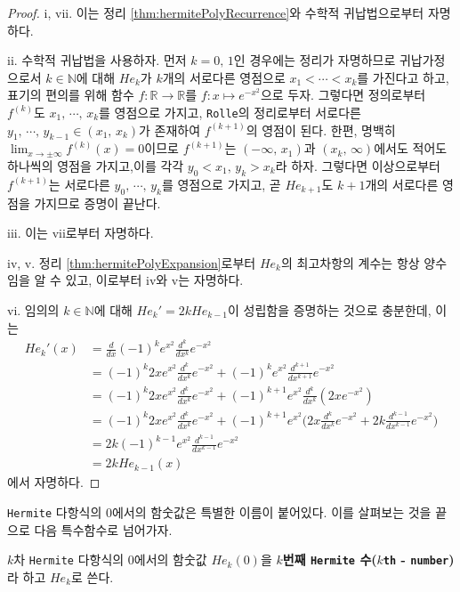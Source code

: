 \begin{proof}
    i, vii. 이는 정리 \ref{thm:hermitePolyRecurrence}와 수학적 귀납법으로부터 자명하다.

    ii. 수학적 귀납법을 사용하자. 먼저 $k=0,\,1$인 경우에는 정리가 자명하므로 귀납가정으로서 $k\in\mathbb{N}$에 대해 $He_k$가 $k$개의 서로다른 영점으로 $x_1<\cdots<x_k$를 가진다고 하고, 표기의 편의를 위해 함수 $f:\mathbb{R}\to\mathbb{R}$를 $f:x\mapsto e^{-x^2}$으로 두자. 그렇다면 정의로부터 $f^{(k)}$도 $x_1,\,\cdots,\,x_k$를 영점으로 가지고, \texttt{Rolle}의 정리로부터 서로다른 $y_1,\,\cdots,\,y_{k-1}\in(x_1,\,x_k)$가 존재하여 $f^{(k+1)}$의 영점이 된다. 한편, 명백히 $\lim_{x\to\pm\infty}f^{(k)}(x)=0$이므로 $f^{(k+1)}$는 $(-\infty,\,x_1)$과 $(x_k,\,\infty)$에서도 적어도 하나씩의 영점을 가지고,\footnotemark 이를 각각 $y_0<x_1,\,y_k>x_k$라 하자. 그렇다면 이상으로부터 $f^{(k+1)}$는 서로다른 $y_0,\,\cdots,\,y_k$를 영점으로 가지고, 곧 $He_{k+1}$도 $k+1$개의 서로다른 영점을 가지므로 증명이 끝난다.

    iii. 이는 vii로부터 자명하다.

    iv, v. 정리 \ref{thm:hermitePolyExpansion}로부터 $He_k$의 최고차항의 계수는 항상 양수임을 알 수 있고, 이로부터 iv와 v는 자명하다.

    vi. 임의의 $k\in\mathbb{N}$에 대해 $He_k'=2kHe_{k-1}$이 성립함을 증명하는 것으로 충분한데, 이는 
    \begin{align*}
        He_k'(x)&=\frac{d}{dx}(-1)^ke^{x^2}\frac{d^k}{dx^k}e^{-x^2}\\
        &=(-1)^k2xe^{x^2}\frac{d^k}{dx^k}e^{-x^2}+(-1)^ke^{x^2}\frac{d^{k+1}}{dx^{k+1}}e^{-x^2}\\
        &=(-1)^k2xe^{x^2}\frac{d^k}{dx^k}e^{-x^2}+(-1)^{k+1}e^{x^2}\frac{d^k}{dx^k}(2xe^{-x^2})\\
        &=(-1)^k2xe^{x^2}\frac{d^k}{dx^k}e^{-x^2}+(-1)^{k+1}e^{x^2}\bigg(2x\frac{d^k}{dx^k}e^{-x^2}+2k\frac{d^{k-1}}{dx^{k-1}}e^{-x^2}\bigg)\\
        &=2k(-1)^{k-1}e^{x^2}\frac{d^{k-1}}{dx^{k-1}}e^{-x^2}\\
        &=2kHe_{k-1}(x)
    \end{align*}
    에서 자명하다.
\end{proof}

\texttt{Hermite} 다항식의 $0$에서의 함숫값은 특별한 이름이 붙어있다. 이를 살펴보는 것을 끝으로 다음 특수함수로 넘어가자.

\begin{definition}
    $k$차 \texttt{Hermite} 다항식의 $0$에서의 함숫값 $He_k(0)$을 \textbf{$k$번째 \texttt{Hermite} 수($k$\texttt{th} - \texttt{number})}라 하고 $He_k$로 쓴다.
\end{definition}

